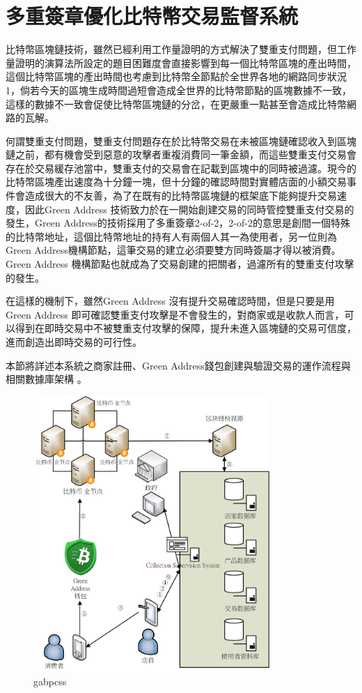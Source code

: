 
\chapter{多重簽章優化比特幣交易監督系統}
比特幣區塊鏈技術，雖然已經利用工作量證明的方式解決了雙重支付問題，但工作量證明的演算法所設定的題目困難度會直接影響到每一個比特幣區塊的產出時間，這個比特幣區塊的產出時間也考慮到比特幣全節點於全世界各地的網路同步狀況1，倘若今天的區塊生成時間過短會造成全世界的比特幣節點的區塊數據不一致，這樣的數據不一致會促使比特幣區塊鏈的分岔，在更嚴重一點甚至會造成比特幣網路的瓦解。 

何謂雙重支付問題，雙重支付問題存在於比特幣交易在未被區塊鏈確認收入到區塊鏈之前，都有機會受到惡意的攻擊者重複消費同一筆金額，而這些雙重支付交易會存在於交易緩存池當中，雙重支付的交易會在記載到區塊中的同時被過濾。現今的比特幣區塊產出速度為十分鐘一塊，但十分鐘的確認時間對實體店面的小額交易事件會造成很大的不友善，為了在既有的比特幣區塊鏈的框架底下能夠提升交易速度，因此Green Address 技術致力於在一開始創建交易的同時管控雙重支付交易的發生，Green Address的技術採用了多重簽章2-of-2，2-of-2的意思是創間一個特殊的比特幣地址，這個比特幣地址的持有人有兩個人其一為使用者，另一位則為Green Address機構節點，這筆交易的建立必須要雙方同時簽屬才得以被消費。Green Address 機構節點也就成為了交易創建的把關者，過濾所有的雙重支付攻擊的發生。 

在這樣的機制下，雖然Green Address 沒有提升交易確認時間，但是只要是用Green Address 即可確認雙重支付攻擊是不會發生的，對商家或是收款人而言，可以得到在即時交易中不被雙重支付攻擊的保障，提升未進入區塊鏈的交易可信度，進而創造出即時交易的可行性。 

本節將詳述本系統之商家註冊、Green Address錢包創建與驗證交易的運作流程與相關數據庫架構 。
	\begin{figure}[h]
		\centering
		\includegraphics[width = 0.8\textwidth]{gabpcss.png}
		\caption{gabpcss}\label{gabpcss}
	\end{figure}

